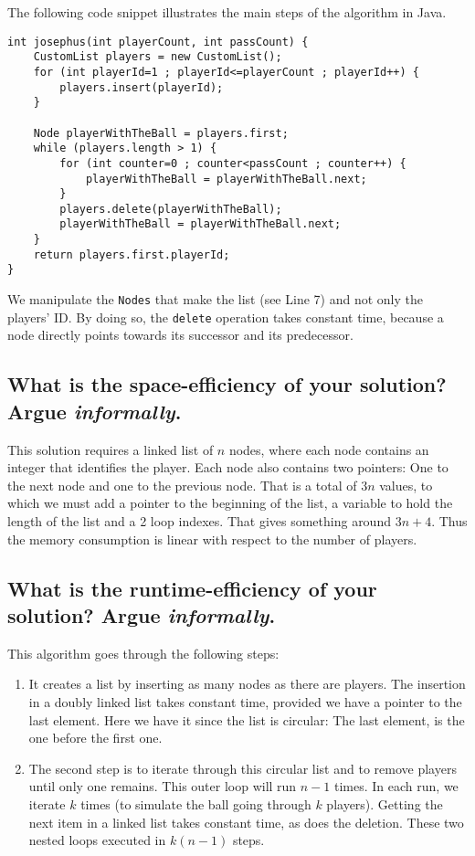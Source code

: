 \documentclass[11pt]{article}
\begin{document}
The following code snippet illustrates the main steps of the
algorithm in Java.
\begin{verbatim}
int josephus(int playerCount, int passCount) {
    CustomList players = new CustomList();
    for (int playerId=1 ; playerId<=playerCount ; playerId++) {
        players.insert(playerId);
    }

    Node playerWithTheBall = players.first;
    while (players.length > 1) {
        for (int counter=0 ; counter<passCount ; counter++) {
            playerWithTheBall = playerWithTheBall.next;
        }
        players.delete(playerWithTheBall);
        playerWithTheBall = playerWithTheBall.next;
    }
    return players.first.playerId;
}
\end{verbatim}

We manipulate the \texttt{Nodes} that make the list (see Line 7) and
not only the players' ID. By doing so, the \texttt{delete} operation takes
constant time, because a node directly points towards its successor
and its predecessor.

\subsection{What is the space-efficiency of your solution? Argue \emph{informally}.}
\label{sec:org8a72f43}

This solution requires a linked list of \(n\) nodes, where each node
contains an integer that identifies the player. Each node also
contains two pointers: One to the next node and one to the previous
node. That is a total of \(3n\) values, to which we must add a
pointer to the beginning of the list, a variable to hold the length
of the list and a 2 loop indexes. That gives something around \(3n +
   4\). Thus the memory consumption is linear with respect to the
number of players.

\subsection{What is the runtime-efficiency of your solution? Argue \emph{informally}.}
\label{sec:orgbcd8665}

This algorithm goes through the following steps:

\begin{enumerate}
\item It creates a list by inserting as many nodes as there are
players. The insertion in a doubly linked list takes constant
time, provided we have a pointer to the last element. Here we
have it since the list is circular: The last element, is the
one before the first one.

\item The second step is to iterate through this circular list and
to remove players until only one remains. This outer loop will
run \(n-1\) times. In each run, we iterate \(k\)
times (to simulate the ball going through \(k\) players). Getting
the next item in a linked list takes constant time, as does
the deletion. These two nested loops executed in \(k(n-1)\)
steps.
\end{enumerate}
\end{document}
